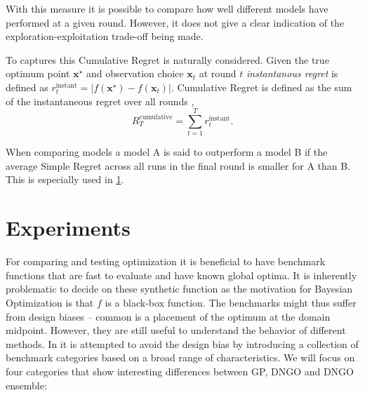 \documentclass[conference,compsoc]{IEEEtran}
\theoremstyle{definition}
\begin{document}
        With this measure it is possible to compare how well different models have performed at a given round.
        However, it does not give a clear indication of the exploration-exploitation trade-off being made.

        To captures this Cumulative Regret is naturally considered.
        Given the true optimum point $\bm{x}^\star$ and observation choice $\bm{x}_t$ at round $t$ \emph{instantanous regret} is defined as $r^{\mathrm{instant}}_t = |f(\bm{x}^\star) - f(\bm{x}_t)|$.
        Cumulative Regret is defined as the sum of the instantaneous regret over all rounds \parencite{srinivas_gaussian_2012}, 
            \begin{equation}
                R^{\mathrm{cumulative}}_T = \sum_{t=1}^T r^{\mathrm{instant}}_t.
            \end{equation}


        
        When comparing models a model A is said to outperform a model B if the average Simple Regret across all runs in the final round is smaller for A than B. 
        This is especially used in \cref{sec:exp}.

\section{Experiments}\label{sec:exp}

    For comparing and testing optimization it is beneficial to have benchmark functions that are fast to evaluate and have known global optima.
    It is inherently problematic to decide on these synthetic function as the motivation for Bayesian Optimization is that $f$ is a black-box function.
    The benchmarks might thus suffer from design biases -- common is a placement of the optimum at the domain midpoint.
    However, they are still useful to understand the behavior of different methods.
    In \parencite{dewancker_stratified_2016} it is attempted to avoid the design bias by introducing a collection of benchmark categories based on a broad range of characteristics.
    We will focus on four categories that show interesting differences between GP, DNGO and DNGO ensemble:
\end{document}
